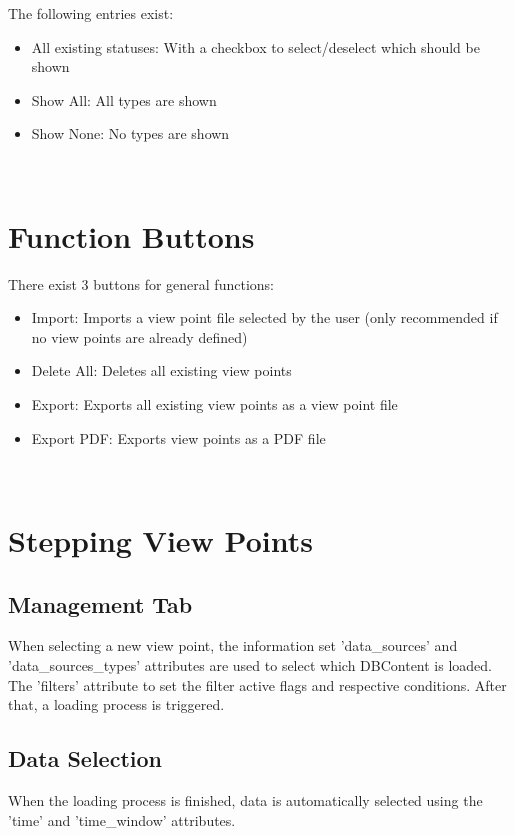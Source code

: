 The following entries exist:

\begin{itemize}  
\item All existing statuses: With a checkbox to select/deselect which should be shown
\item Show All: All types are shown
\item Show None: No types are shown
\end{itemize}
\ \\

\section{Function Buttons}

There exist 3 buttons for general functions:

\begin{itemize}  
\item Import: Imports a view point file selected by the user (only recommended if no view points are already defined)
\item Delete All: Deletes all existing view points
\item Export: Exports all existing view points as a view point file
\item Export PDF: Exports view points as a PDF file
\end{itemize}
\ \\

\section{Stepping View Points}

\subsection{Management Tab} 
When selecting a new view point, the information set 'data\_sources' and 'data\_sources\_types' attributes are used to select which DBContent is loaded. The 'filters' attribute to set the filter active flags and respective conditions. After that, a loading process is triggered. \\

\subsection{Data Selection}

When the loading process is finished, data is automatically selected using the 'time' and 'time\_window' attributes.

